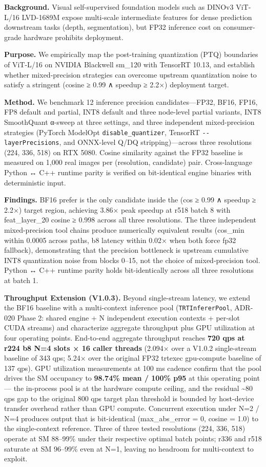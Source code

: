 \documentclass[
]{article}
\begin{document}
\textbf{Background.} Visual self-supervised foundation models such as
DINOv3 ViT-L/16 LVD-1689M expose multi-scale intermediate features for
dense prediction downstream tasks (depth, segmentation), but FP32
inference cost on consumer-grade hardware prohibits deployment.

\textbf{Purpose.} We empirically map the post-training quantization
(PTQ) boundaries of ViT-L/16 on NVIDIA Blackwell sm\_120 with TensorRT
10.13, and establish whether mixed-precision strategies can overcome
upstream quantization noise to satisfy a stringent (cosine ≥ 0.99 ∧
speedup ≥ 2.2×) deployment target.

\textbf{Method.} We benchmark 12 inference precision candidates---FP32,
BF16, FP16, FP8 default and partial, INT8 default and three node-level
partial variants, INT8 SmoothQuant α-sweep at three settings, and three
independent mixed-precision strategies (PyTorch ModelOpt
\texttt{disable\_quantizer}, TensorRT \texttt{-\/-layerPrecisions}, and
ONNX-level Q/DQ stripping)---across three resolutions (224, 336, 518) on
RTX 5080. Cosine similarity against the FP32 baseline is measured on
1,000 real images per (resolution, candidate) pair. Cross-language
Python ↔ C++ runtime parity is verified on bit-identical engine binaries
with deterministic input.

\textbf{Findings.} BF16 prefer is the only candidate inside the (cos ≥
0.99 ∧ speedup ≥ 2.2×) target region, achieving 3.86× peak speedup at
r518 batch 8 with feat\_layer\_20 cosine ≥ 0.998 across all three
resolutions. The three independent mixed-precision tool chains produce
numerically equivalent results (cos\_min within 0.0005 across paths, b8
latency within 0.02× when both force fp32 fallback), demonstrating that
the precision bottleneck is upstream cumulative INT8 quantization noise
from blocks 0--15, not the choice of mixed-precision tool. Python ↔ C++
runtime parity holds bit-identically across all three resolutions at
batch 1.

\textbf{Throughput Extension (V1.0.3).} Beyond single-stream latency, we
extend the BF16 baseline with a multi-context inference pool
(\texttt{TRTInfererPool}, ADR-020 Phase 2: shared engine + N independent
execution contexts + per-slot CUDA streams) and characterize aggregate
throughput plus GPU utilization at four operating points. End-to-end
aggregate throughput reaches \textbf{720 qps at r224 b8 N=4 slots × 16
caller threads} (2.094× over a V1.0.2 single-stream baseline of 343 qps;
5.24× over the original FP32 trtexec gpu-compute baseline of 137 qps).
GPU utilization measurements at 100 ms cadence confirm that the pool
drives the SM occupancy to \textbf{98.74\% mean / 100\% p95} at this
operating point --- the in-process pool is at the hardware compute
ceiling, and the residual \textasciitilde80 qps gap to the original 800
qps target plan threshold is bounded by host-device transfer overhead
rather than GPU compute. Concurrent execution under N=2 / N=4 produces
output that is bit-identical (max\_abs\_error = 0, cosine = 1.0) to the
single-context reference. Three of three tested resolutions (224, 336,
518) operate at SM 88--99\% under their respective optimal batch points;
r336 and r518 saturate at SM 96--99\% even at N=1, leaving no headroom
for multi-context to exploit.
\end{document}
